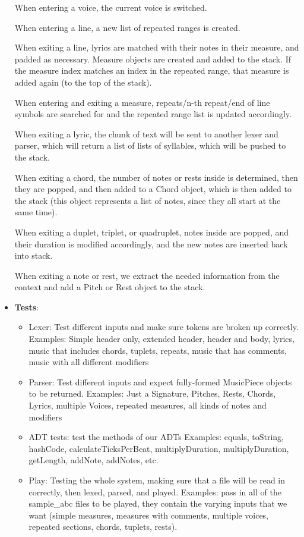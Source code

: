 \documentclass[12pt]{book}
\begin{document}
\begin{itemize}
When entering a voice, the current voice is switched.

When entering a line, a new list of repeated ranges is created.

When exiting a line, lyrics are matched with their notes in their measure, and padded as necessary. Measure objects are created and added to the stack. If the measure index matches an index in the repeated range, that measure is added again (to the top of the stack). 

When entering and exiting a measure, repeats/n-th repeat/end of line symbols are searched for and the repeated range list is updated accordingly.

When exiting a lyric, the chunk of text will be sent to another lexer and parser, which will return a list of lists of syllables, which will be pushed to the stack.

When exiting a chord, the number of notes or rests inside is determined, then they are popped, and then added to a Chord object, which is then added to the stack (this object represents a list of notes, since they all start at the same time).

When exiting a duplet, triplet, or quadruplet, notes inside are popped, and their duration is modified accordingly, and the new notes are inserted back into stack.

When exiting a note or rest, we extract the needed information from the context and add a Pitch or Rest object to the stack. 


\item {\bf Tests}:
\begin{itemize}
\item Lexer: Test different inputs and make sure tokens are broken up correctly. 
Examples: Simple header only, extended header, header and body, lyrics, music that includes chords, tuplets, repeats, music that has comments, music with all different modifiers
\item Parser: Test different inputs and expect fully-formed MusicPiece objects to be returned. 
Examples: Just a Signature, Pitches, Rests, Chords, Lyrics, multiple Voices, repeated measures, all kinds of notes and modifiers
\item ADT tests: test the methods of our ADTs
Examples: equals, toString, hashCode, calculateTicksPerBeat, multiplyDuration, multiplyDuration, getLength, addNote, addNotes, etc.
\item Play: Testing the whole system, making sure that a file will be read in correctly, then lexed, parsed, and played.
Examples: pass in all of the sample\_abc files to be played, they contain the varying inputs that we want (simple measures, measures with comments, multiple voices, repeated sections, chords, tuplets, rests).
\end{itemize}

\end{itemize}
\end{document}
